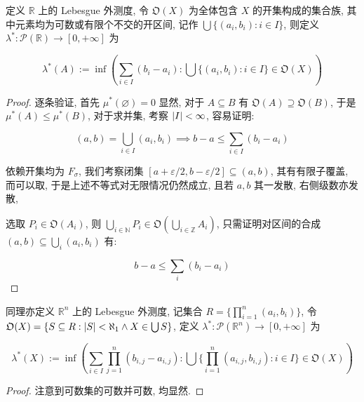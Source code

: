 \begin{definition}
    \label {definition:Lebesgue outer measure}
    定义 \(\mathbb{R}\) 上的 Lebesgue 外测度, 令 \(\mathfrak{O} (X)\) 为全体包含 \(X\) 的开集构成的集合族, 其中元素均为可数或有限个不交的开区间,
    记作 \(\bigcup \{(a_i, b_i): i \in I\}\), 则定义 \(\lambda^\ast: \mathcal{P} (\mathbb{R}) \to [0, +\infty]\) 为

    \[
        \lambda^\ast (A) := \inf (\sum_{i \in I} (b_i - a_i): \bigcup \{(a_i, b_i): i \in I\} \in \mathfrak{O} (X))
    \]

    \begin{proof}
        逐条验证, 首先 \(\mu^\ast (\varnothing) = 0\) 显然, 对于 \(A \subseteq B\) 有 \(\mathfrak{O} (A) \supseteq \mathfrak{O} (B)\),
        于是 \(\mu^\ast (A) \leq \mu^\ast (B)\), 对于求并集, 考察 \(\abs{I} < \infty\), 容易证明:

        \[
            (a,b) = \bigcup_{i \in I} (a_i, b_i) \implies b - a \leq \sum_{i \in I} (b_i - a_i)
        \]


        依赖开集均为 \(F_\sigma\), 我们考察闭集 \([a + \varepsilon/2,b - \varepsilon/2] \subseteq (a,b)\), 其有有限子覆盖, 
        而可以取, 于是上述不等式对无限情况仍然成立, 且若 \(a,b\) 其一发散, 右侧级数亦发散,

        选取 \(P_i \in \mathfrak{O} (A_i)\), 则 \(\bigcup_{i \in \mathbb{N}} P_i \in \mathfrak{O} (\bigcup_{i \in \mathbb{Z}} A_i)\),
        只需证明对区间的合成 \((a,b) \subseteq \bigcup_{i} (a_i,b_i)\) 有:

        \[
            b - a \leq \sum_{i} (b_i - a_i)
        \]
    \end{proof}
\end{definition}

\begin{definition}
    同理亦定义 \(\mathbb{R}^n\) 上的 Lebesgue 外测度, 记集合 \(R = \{\prod_{i=1}^{n} (a_i,b_i)\}\),
    令 \(\mathfrak{O} (X) = \{S \subseteq R : \abs{S} < \aleph_1 \land X \in \bigcup S\}\), 定义 \(\lambda^\ast : \mathcal{P} (\mathbb{R}^n) \to [0, +\infty]\) 为

    \[
        \lambda^\ast (X) := \inf (\sum_{i \in I} \prod_{j=1}^{n} (b_{i,j} - a_{i,j}): \bigcup \{\prod_{i=1}^{n} (a_{i,j},b_{i,j}) : i \in I\} \in \mathfrak{O} (X))
    \]

    \begin{proof}
        注意到可数集的可数并可数, 均显然.
    \end{proof}
\end{definition}

